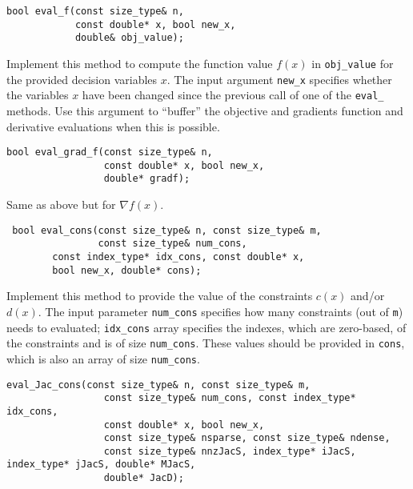 \documentclass[11pt]{article}
\begin{document}
\begin{lstlisting} 
bool eval_f(const size_type& n, 
            const double* x, bool new_x, 
            double& obj_value);
\end{lstlisting} 

\noindent Implement this method to compute the function value $f(x)$ in \texttt{obj\_value} for the provided decision variables $x$. The input argument \texttt{new\_x} specifies whether the variables $x$ have been changed since the previous call of one of the \texttt{eval\_} methods. Use this argument to ``buffer'' the objective and gradients function and derivative evaluations when this is possible.

\begin{lstlisting} 
bool eval_grad_f(const size_type& n, 
                 const double* x, bool new_x, 
                 double* gradf);
\end{lstlisting} 

\noindent Same as above but for $\nabla f(x)$.

\begin{lstlisting} 
 bool eval_cons(const size_type& n, const size_type& m, 
                const size_type& num_cons,
		const index_type* idx_cons, const double* x, 
		bool new_x, double* cons);
\end{lstlisting} 

\noindent Implement this method to provide the value of the constraints $c(x)$ and/or $d(x)$. The input parameter \texttt{num\_cons} specifies how many constraints (out of \texttt{m}) needs to evaluated; \texttt{idx\_cons} array specifies the indexes, which are zero-based, of the constraints  and is of size \texttt{num\_cons}. These values should be provided in \texttt{cons}, which is also an array of size \texttt{num\_cons}.

\begin{lstlisting} 
eval_Jac_cons(const size_type& n, const size_type& m, 
			     const size_type& num_cons, const index_type* idx_cons,
			     const double* x, bool new_x,
			     const size_type& nsparse, const size_type& ndense, 
			     const size_type& nnzJacS, index_type* iJacS, index_type* jJacS, double* MJacS, 
			     double* JacD);
\end{lstlisting} 

\end{document}
